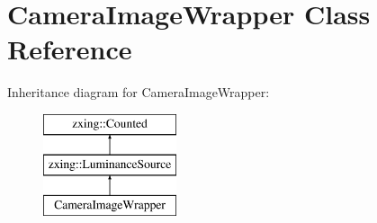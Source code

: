 \hypertarget{class_camera_image_wrapper}{}\section{Camera\+Image\+Wrapper Class Reference}
\label{class_camera_image_wrapper}
Inheritance diagram for Camera\+Image\+Wrapper\+:\begin{figure}[H]
\begin{center}
\leavevmode
\includegraphics[height=3.000000cm]{class_camera_image_wrapper}
\end{center}
\end{figure}
